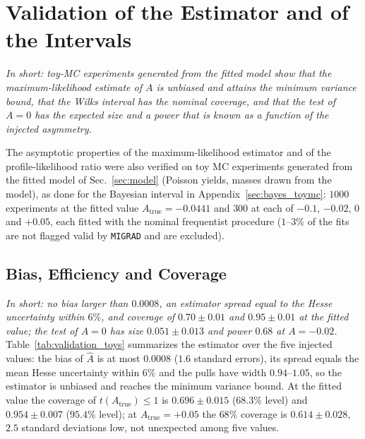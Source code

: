 \section{Validation of the Estimator and of the Intervals}
\label{sec:validation}
\emph{In short: toy-MC experiments generated from the fitted model show that the maximum-likelihood estimate of $A$ is unbiased and attains the minimum variance bound, that the Wilks interval has the nominal coverage, and that the test of $A=0$ has the expected size and a power that is known as a function of the injected asymmetry.}

The asymptotic properties of the maximum-likelihood estimator and of the profile-likelihood ratio were also verified on toy MC experiments generated from the fitted model of Sec.~\ref{sec:model} (Poisson yields, masses drawn from the model), as done for the Bayesian interval in Appendix~\ref{sec:bayes_toymc}: $1000$ experiments at the fitted value $A_{\mathrm{true}}=-0.0441$ and $300$ at each of $-0.1$, $-0.02$, $0$ and $+0.05$, each fitted with the nominal frequentist procedure ($1$--$3\%$ of the fits are not flagged valid by \texttt{MIGRAD} and are excluded).

\subsection{Bias, Efficiency and Coverage}
\label{sec:validation_estimator}
\emph{In short: no bias larger than $0.0008$, an estimator spread equal to the Hesse uncertainty within $6\%$, and coverage of $0.70\pm0.01$ and $0.95\pm0.01$ at the fitted value; the test of $A=0$ has size $0.051\pm0.013$ and power $0.68$ at $A=-0.02$.}
Table~\ref{tab:validation_toys} summarizes the estimator over the five injected values: the bias of $\hat A$ is at most $0.0008$ ($1.6$ standard errors), its spread equals the mean Hesse uncertainty within $6\%$ and the pulls have width $0.94$--$1.05$, so the estimator is unbiased and reaches the minimum variance bound. At the fitted value the coverage of $t(A_{\mathrm{true}})\leq1$ is $0.696\pm0.015$ ($68.3\%$ level) and $0.954\pm0.007$ ($95.4\%$ level); at $A_{\mathrm{true}}=+0.05$ the $68\%$ coverage is $0.614\pm0.028$, $2.5$ standard deviations low, not unexpected among five values.

